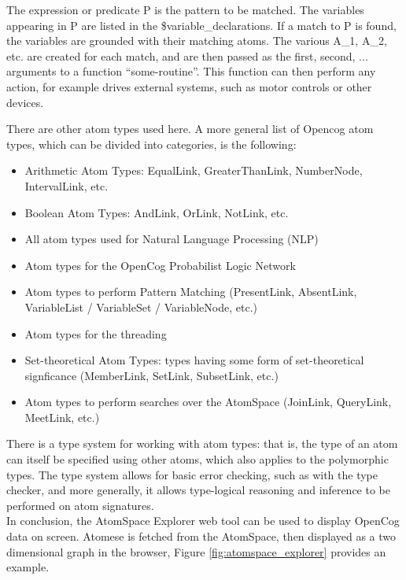 \begin{itemize}
The expression or predicate P is the pattern to be matched. The variables appearing in P are listed in the \$variable\_declarations. If a match to P is found, the variables are grounded with their matching atoms. The various A\_1, A\_2, etc. are created for each match, and are then passed as the first, second, ... arguments to a function \enquote{some-routine}. This function can then perform any action, for example drives external systems, such as motor controls or other devices.
\end{itemize}

There are other atom types used here. A more general list of Opencog atom types, which can be divided into categories, is the following:

\begin{itemize}
\item Arithmetic Atom Types: EqualLink, GreaterThanLink, NumberNode, IntervalLink, etc.
\item Boolean Atom Types: AndLink, OrLink, NotLink, etc. 
\item All atom types used for Natural Language Processing (NLP)
\item Atom types for the OpenCog Probabilist Logic Network
\item Atom types to perform Pattern Matching (PresentLink, AbsentLink, VariableList / VariableSet / VariableNode, etc.) 
\item Atom types for the threading 
\item Set-theoretical Atom Types: types having some form of set-theoretical signficance (MemberLink, SetLink, SubsetLink, etc.)
\item Atom types to perform searches over the AtomSpace (JoinLink, QueryLink, MeetLink, etc.) 
\end{itemize}

There is a type system for working with atom types: that is, the type of an atom can itself be specified using other atoms, which also applies to the polymorphic types. The type system allows for basic error checking, such as with the type checker, and more generally, it allows type-logical reasoning and inference to be performed on atom signatures. \\

In conclusion, the AtomSpace Explorer web tool can be used to display OpenCog data on screen. Atomese is fetched from the AtomSpace, then displayed as a two dimensional graph in the browser, Figure \ref{fig:atomspace_explorer} provides an example. \\


